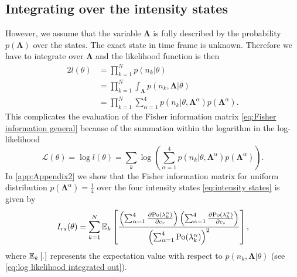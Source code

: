 

\subsection{Integrating over the intensity states\label{sub:FI int out}}
%
However, we assume that the variable $\bm{\Lambda}$ is fully described by the probability $p(\bm{\Lambda})$ over the states. The exact state in time frame is unknown. Therefore we have to integrate over $\bm{\Lambda}$ and the likelihood function is then
%
\begin{alignat}{2}
	l(\theta)
	&=\prod_{k=1}^Np(n_k|\theta)\nonumber\\
	&=\prod_{k=1}^N\int_{\bm{\Lambda}}p(n_k,\bm{\Lambda}|\theta)\nonumber\\
	&=\prod_{k=1}^N\sum_{\alpha=1}^4p(n_k|\theta,\bm{\Lambda}^\alpha)p(\bm{\Lambda}^\alpha).
	\label{eq:FREM likelihood Lambda integrated out}
\end{alignat}
%
This complicates the evaluation of the Fisher information matrix \autoref{eq:Fisher information general} because of the summation within the logarithm in the log-likelihood
%
\begin{equation}
	\mathcal{L}(\theta)=\log l(\theta)=\sum_k\log\left(\sum_{\alpha=1}^4p(n_k|\theta,\bm{\Lambda}^\alpha)p(\bm{\Lambda}^\alpha)\right).
	\label{eq:log likelihood integrated out}
\end{equation}
%
In \autoref{app:Appendix2} we show that the Fisher information matrix for uniform distribution $p(\bm{\Lambda}^\alpha)=\frac{1}{4}$ over the four intensity states \autoref{eq:intensity states} is given by
%
\begin{equation}
	I_{rs}(\theta) =\sum_{k=1}^N\mathbb{E}_k\left[\frac{\left(\sum_{\alpha=1}^4\frac{\partial\mathrm{Po}(\lambda_k^\alpha)}{\partial c_r}\right)\left(\sum_{\alpha=1}^4\frac{\partial\mathrm{Po}(\lambda_k^\alpha)}{\partial c_s}\right)}{\left(\sum_{\alpha=1}^4\mathrm{Po}(\lambda_k^\alpha)\right)^2}\right],
	\label{eq:Fisher Information Blinking Integrating Out}
\end{equation}
%
where $\mathbb{E}_k\left[.\right]$ represents the expectation value with respect to $p(n_k,\bm{\Lambda}|\theta)$ (see \autoref{eq:log likelihood integrated out}). 

